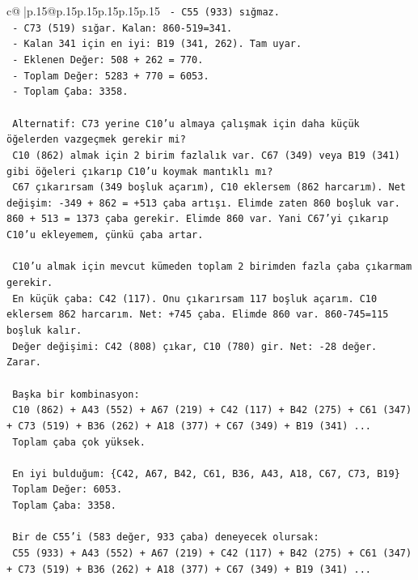 \documentclass{article}
\begin{document}
{\begin{supertabular}{c@{$\;$}|p{.15\linewidth}@{}p{.15\linewidth}p{.15\linewidth}p{.15\linewidth}p{.15\linewidth}p{.15\linewidth}}
{{{\texttt{   {-} C55 (933) sığmaz.} \\
\texttt{   {-} C73 (519) sığar. Kalan: 860{-}519=341.} \\
\texttt{     {-} Kalan 341 için en iyi: B19 (341, 262). Tam uyar.} \\
\texttt{     {-} Eklenen Değer: 508 + 262 = 770.} \\
\texttt{     {-} Toplam Değer: 5283 + 770 = 6053.} \\
\texttt{     {-} Toplam Çaba: 3358.} \\
\\ 
\texttt{   Alternatif: C73 yerine C10'u almaya çalışmak için daha küçük öğelerden vazgeçmek gerekir mi?} \\
\texttt{   C10 (862) almak için 2 birim fazlalık var. C67 (349) veya B19 (341) gibi öğeleri çıkarıp C10'u koymak mantıklı mı?} \\
\texttt{   C67 çıkarırsam (349 boşluk açarım), C10 eklersem (862 harcarım). Net değişim: {-}349 + 862 = +513 çaba artışı. Elimde zaten 860 boşluk var. 860 + 513 = 1373 çaba gerekir. Elimde 860 var. Yani C67'yi çıkarıp C10'u ekleyemem, çünkü çaba artar.} \\
\\ 
\texttt{   C10'u almak için mevcut kümeden toplam 2 birimden fazla çaba çıkarmam gerekir.} \\
\texttt{   En küçük çaba: C42 (117). Onu çıkarırsam 117 boşluk açarım. C10 eklersem 862 harcarım. Net: +745 çaba. Elimde 860 var. 860{-}745=115 boşluk kalır.} \\
\texttt{   Değer değişimi: C42 (808) çıkar, C10 (780) gir. Net: {-}28 değer. Zarar.} \\
\\ 
\texttt{   Başka bir kombinasyon:} \\
\texttt{   C10 (862) + A43 (552) + A67 (219) + C42 (117) + B42 (275) + C61 (347) + C73 (519) + B36 (262) + A18 (377) + C67 (349) + B19 (341) ...} \\
\texttt{   Toplam çaba çok yüksek.} \\
\\ 
\texttt{   En iyi bulduğum: \{C42, A67, B42, C61, B36, A43, A18, C67, C73, B19\}} \\
\texttt{   Toplam Değer: 6053.} \\
\texttt{   Toplam Çaba: 3358.} \\
\\ 
\texttt{   Bir de C55'i (583 değer, 933 çaba) deneyecek olursak:} \\
\texttt{   C55 (933) + A43 (552) + A67 (219) + C42 (117) + B42 (275) + C61 (347) + C73 (519) + B36 (262) + A18 (377) + C67 (349) + B19 (341) ...} \\
}}}
\end{supertabular}}
\end{document}
